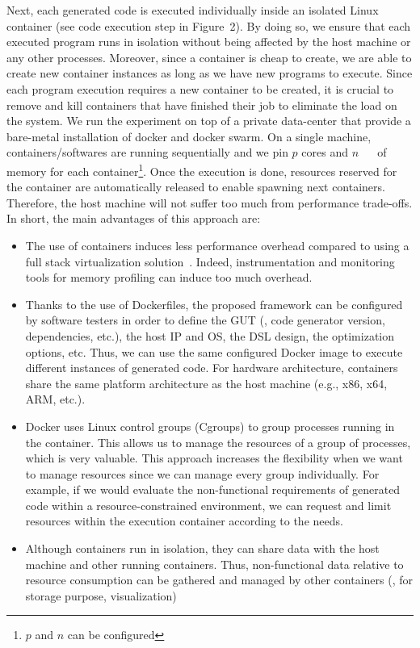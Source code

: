 Next, each generated code is executed individually inside an isolated Linux container (see code execution step in Figure~2). By doing so, we ensure that each executed program runs in isolation without being affected by the host machine or any other processes. Moreover, since a container is cheap to create, we are able to create new container instances as long as we have new programs to execute.  
Since each program execution requires a new container to be created, it is crucial to remove and kill containers that have finished their job to eliminate the load on the system. We run the experiment on top of a private data-center that provide a bare-metal installation of  docker and docker swarm. On a single machine,  containers/softwares are running sequentially and we pin $p$ cores and $n$ \SI{}{\giga\byte}
of memory for each container\footnote{$p$ and $n$ can be configured}. Once the execution is done, resources reserved for the container are automatically released to enable spawning next containers. Therefore, the host machine will not suffer too much from performance trade-offs.
In short, the main advantages of this approach are:
\begin{itemize}
	\item The use of containers induces less performance overhead compared to using a full stack virtualization solution~\cite{spoiala2016performance}. Indeed, instrumentation and monitoring tools for memory profiling can induce too much overhead.
	\item Thanks to the use of Dockerfiles, the proposed framework can be  configured by software testers in order to define the GUT (\eg, code generator version, dependencies, etc.), the host IP and OS, the DSL design, the optimization options, etc. Thus, we can use the same configured Docker image to execute different instances of generated code. For hardware architecture, containers share the same platform architecture as the host machine (e.g., x86, x64, ARM, etc.). 
	\item Docker uses Linux control groups (Cgroups) to group processes running in the container. This allows us to manage the resources of a group of processes, which is very valuable. 
	This approach increases the flexibility when we want to manage resources since we can manage every group individually. For example, if we would evaluate the non-functional requirements of generated code within a resource-constrained environment, we can  request and limit resources within the execution container according to the needs.
	\item Although containers run in isolation, they can share data with the host machine and other running containers. Thus, non-functional data relative to resource consumption can be gathered and managed by other containers (\ie, for storage purpose, visualization)
\end{itemize}




